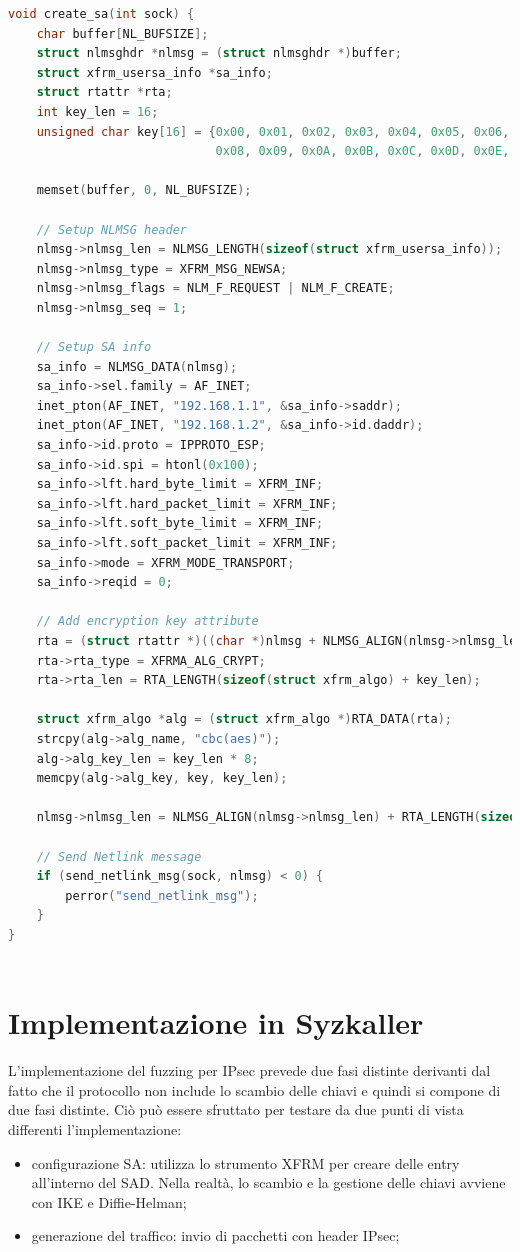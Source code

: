 \documentclass{article}
\begin{document}
\begin{lstlisting}[language=C,caption=Creazione di una SA con socket Netlink in C]
void create_sa(int sock) {
    char buffer[NL_BUFSIZE];
    struct nlmsghdr *nlmsg = (struct nlmsghdr *)buffer;
    struct xfrm_usersa_info *sa_info;
    struct rtattr *rta;
    int key_len = 16;
    unsigned char key[16] = {0x00, 0x01, 0x02, 0x03, 0x04, 0x05, 0x06, 0x07, 
                             0x08, 0x09, 0x0A, 0x0B, 0x0C, 0x0D, 0x0E, 0x0F};

    memset(buffer, 0, NL_BUFSIZE);

    // Setup NLMSG header
    nlmsg->nlmsg_len = NLMSG_LENGTH(sizeof(struct xfrm_usersa_info));
    nlmsg->nlmsg_type = XFRM_MSG_NEWSA;
    nlmsg->nlmsg_flags = NLM_F_REQUEST | NLM_F_CREATE;
    nlmsg->nlmsg_seq = 1;

    // Setup SA info
    sa_info = NLMSG_DATA(nlmsg);
    sa_info->sel.family = AF_INET;
    inet_pton(AF_INET, "192.168.1.1", &sa_info->saddr);
    inet_pton(AF_INET, "192.168.1.2", &sa_info->id.daddr);
    sa_info->id.proto = IPPROTO_ESP;
    sa_info->id.spi = htonl(0x100);
    sa_info->lft.hard_byte_limit = XFRM_INF;
    sa_info->lft.hard_packet_limit = XFRM_INF;
    sa_info->lft.soft_byte_limit = XFRM_INF;
    sa_info->lft.soft_packet_limit = XFRM_INF;
    sa_info->mode = XFRM_MODE_TRANSPORT;
    sa_info->reqid = 0;

    // Add encryption key attribute
    rta = (struct rtattr *)((char *)nlmsg + NLMSG_ALIGN(nlmsg->nlmsg_len));
    rta->rta_type = XFRMA_ALG_CRYPT;
    rta->rta_len = RTA_LENGTH(sizeof(struct xfrm_algo) + key_len);

    struct xfrm_algo *alg = (struct xfrm_algo *)RTA_DATA(rta);
    strcpy(alg->alg_name, "cbc(aes)");
    alg->alg_key_len = key_len * 8;
    memcpy(alg->alg_key, key, key_len);

    nlmsg->nlmsg_len = NLMSG_ALIGN(nlmsg->nlmsg_len) + RTA_LENGTH(sizeof(struct xfrm_algo) + key_len);

    // Send Netlink message
    if (send_netlink_msg(sock, nlmsg) < 0) {
        perror("send_netlink_msg");
    }
}
 
\end{lstlisting}

\clearpage
\section{Implementazione in Syzkaller}
L'implementazione del fuzzing per IPsec prevede due fasi distinte derivanti dal fatto che 
il protocollo non include lo scambio delle chiavi e quindi si compone di due fasi distinte. 
Ciò può essere sfruttato per testare da due punti di vista differenti l'implementazione:
\begin{itemize}
  \item configurazione SA: utilizza lo strumento XFRM per creare delle entry all'interno 
    del SAD. Nella realtà, lo scambio e la gestione delle chiavi avviene con IKE e Diffie-Helman;
  \item generazione del traffico: invio di pacchetti con header IPsec;
\end{itemize}
\end{document}
